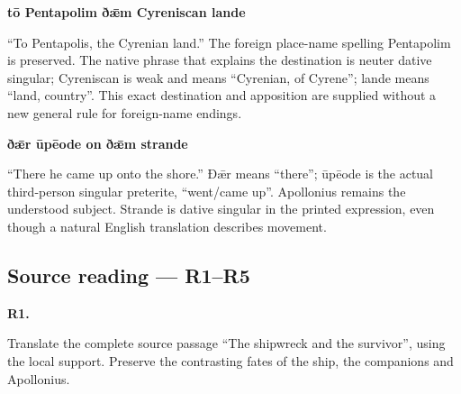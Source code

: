 \textbf{tō Pentapolim ðǣm Cyreniscan lande}

“To Pentapolis, the Cyrenian land.” The foreign place-name spelling Pentapolim is preserved. The native phrase that explains the destination is neuter dative singular; Cyreniscan is weak and means “Cyrenian, of Cyrene”; lande means “land, country”. This exact destination and apposition are supplied without a new general rule for foreign-name endings.

\textbf{ðǣr ūpēode on ðǣm strande}

“There he came up onto the shore.” Ðǣr means “there”; ūpēode is the actual third-person singular preterite, “went/\allowbreak{}came up”. Apollonius remains the understood subject. Strande is dative singular in the printed expression, even though a natural English translation describes movement.

\subsection*{Source reading — R1–R5}

\par\begin{minipage}{\linewidth}\raggedright
\textbf{R1.}

Translate the complete source passage “The shipwreck and the survivor”, using the local support. Preserve the contrasting fates of the ship, the companions and Apollonius.

\end{minipage}\par\addvspace{4pt}

